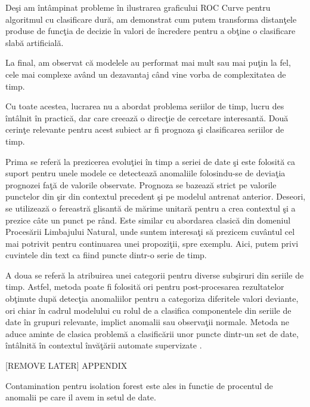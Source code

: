 Deşi am întâmpinat probleme în ilustrarea graficului ROC Curve pentru algoritmul cu clasificare
dură, am demonstrat cum putem transforma distanţele produse de funcţia de decizie în valori 
de încredere pentru a obţine o clasificare slabă artificială.

La final, am observat că modelele au performat mai mult sau mai puţin la fel, cele mai complexe 
având un dezavantaj când vine vorba de complexitatea de timp.

Cu toate acestea, lucrarea nu a abordat problema seriilor de timp, lucru des întâlnit în practică,
dar care creează o direcţie de cercetare interesantă. Două cerinţe relevante pentru acest 
subiect ar fi prognoza şi clasificarea seriilor de timp. 

Prima se referă la prezicerea evoluţiei
în timp a seriei de date şi este folosită ca suport pentru unele modele ce detectează anomaliile
folosindu-se de deviaţia prognozei faţă de valorile observate. Prognoza se bazează strict pe 
valorile punctelor din şir din contextul precedent şi pe modelul antrenat anterior. Deseori,
se utilizează o fereastră glisantă de mărime unitară pentru a crea contextul şi a prezice 
câte un punct pe rând. Este similar cu abordarea clasică 
din domeniul Procesării Limbajului Natural, unde suntem interesaţi să prezicem cuvântul cel 
mai potrivit pentru continuarea unei propoziţii, spre exemplu. Aici, putem privi cuvintele
din text ca fiind puncte dintr-o serie de timp.

A doua se referă la atribuirea unei categorii pentru diverse subşiruri din seriile de timp.
Astfel, metoda poate fi folosită ori pentru post-procesarea rezultatelor obţinute după 
detecţia anomaliilor pentru a categoriza diferitele valori deviante, ori chiar în cadrul 
modelului cu rolul de a clasifica componentele din seriile de date în grupuri relevante,
implict anomalii sau observaţii normale. Metoda ne aduce aminte de clasica problemă
a clasificării unor puncte dintr-un set de date, întâlnită în contextul învăţării automate
supervizate \cite{time-series}.


[REMOVE LATER] APPENDIX 

Contamination pentru isolation forest este ales in functie 
de procentul de anomalii pe care il avem in setul de date.

